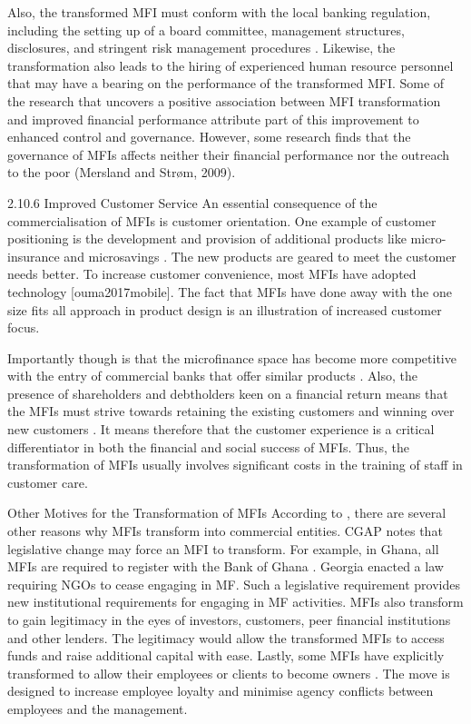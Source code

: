 \documentclass[a4paper, nobind]{templates/ociamthesis}
\begin{document}
Also, the transformed MFI must conform with the local banking regulation, including the setting up of a board committee, management structures, disclosures, and stringent risk management procedures \autocite{frank2008stemming}. Likewise, the transformation also leads to the hiring of experienced human resource personnel that may have a bearing on the performance of the transformed MFI. Some of the research that uncovers a positive association between MFI transformation and improved financial performance attribute part of this improvement to enhanced control and governance. However, some research finds that the governance of MFIs affects neither their financial performance nor the outreach to the poor \autocite{mersland2009cost} (Mersland and Strøm, 2009).

2.10.6 Improved Customer Service
\noindent An essential consequence of the commercialisation of MFIs is customer orientation. One example of customer positioning is the development and provision of additional products like micro-insurance and microsavings \autocite{chandrasekhar2015microsavings}. The new products are geared to meet the customer needs better. To increase customer convenience, most MFIs have adopted technology {[}ouma2017mobile{]}. The fact that MFIs have done away with the one size fits all approach in product design is an illustration of increased customer focus.

Importantly though is that the microfinance space has become more competitive with the entry of commercial banks that offer similar products \autocite{kar2016measuring}. Also, the presence of shareholders and debtholders keen on a financial return means that the MFIs must strive towards retaining the existing customers and winning over new customers \autocite{ballwieser2012agency}. It means therefore that the customer experience is a critical differentiator in both the financial and social success of MFIs. Thus, the transformation of MFIs usually involves significant costs in the training of staff in customer care.

\noindent Other Motives for the Transformation of MFIs
According to \textcite{christen2001commercialization}, there are several other reasons why MFIs transform into commercial entities. CGAP notes that legislative change may force an MFI to transform. For example, in Ghana, all MFIs are required to register with the Bank of Ghana \autocite{bankofghana2017}. Georgia enacted a law requiring NGOs to cease engaging in MF. Such a legislative requirement provides new institutional requirements for engaging in MF activities. MFIs also transform to gain legitimacy in the eyes of investors, customers, peer financial institutions and other lenders. The legitimacy would allow the transformed MFIs to access funds and raise additional capital with ease. Lastly, some MFIs have explicitly transformed to allow their employees or clients to become owners \autocite{lauer2008transforming}. The move is designed to increase employee loyalty and minimise agency conflicts between employees and the management.
\end{document}
